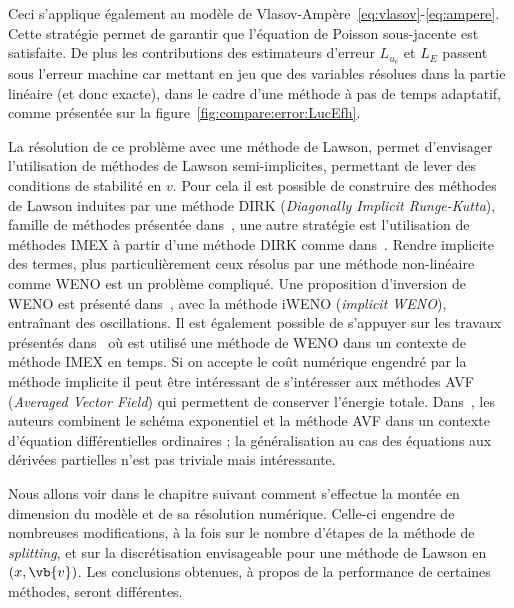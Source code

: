 Ceci s'applique également au modèle de Vlasov-Ampère~\eqref{eq:vlasov}-\eqref{eq:ampere}. Cette stratégie permet de garantir que l'équation de Poisson sous-jacente est satisfaite. De plus les contributions des estimateurs d'erreur $L_{u_c}$ et $L_E$ passent sous l'erreur machine car mettant en jeu que des variables résolues dans la partie linéaire (et donc exacte), dans le cadre d'une méthode à pas de temps adaptatif, comme présentée sur la figure~\ref{fig:compare:error:LucEfh}.

La résolution de ce problème avec une méthode de Lawson, permet d'envisager l'utilisation de méthodes de Lawson semi-implicites, permettant de lever des conditions de stabilité en $v$. Pour cela il est possible de construire des méthodes de Lawson induites par une méthode DIRK (\emph{Diagonally Implicit Runge-Kutta}), famille de méthodes présentée dans~\cite{Alexander:1976}, une autre stratégie est l'utilisation de méthodes IMEX à partir d'une méthode DIRK comme dans~\cite{Cho:2021}. Rendre implicite des termes, plus particulièrement ceux résolus par une méthode non-linéaire comme WENO est un problème compliqué. Une proposition d'inversion de WENO est présenté dans~\cite{Gottlieb:2006}, avec la méthode iWENO (\emph{implicit WENO}), entraînant des oscillations. Il est également possible de s'appuyer sur les travaux présentés dans~\cite{Boscarino:2019} où est utilisé une méthode de WENO dans un contexte de méthode IMEX en temps. Si on accepte le coût numérique engendré par la méthode implicite il peut être intéressant de s'intéresser aux méthodes AVF (\emph{Averaged Vector Field}) qui permettent de conserver l'énergie totale. Dans~\cite{Mei:2021}, les auteurs combinent le schéma exponentiel et la méthode AVF dans un contexte d'équation différentielles ordinaires ; la généralisation au cas des équations aux dérivées partielles n'est pas triviale mais intéressante.

Nous allons voir dans le chapitre suivant comment s'effectue la montée en dimension du modèle et de sa résolution numérique. Celle-ci engendre de nombreuses modifications, à la fois sur le nombre d'étapes de la méthode de \emph{splitting}, et sur la discrétisation envisageable pour une méthode de Lawson en $(x,\vb{v})$. Les conclusions obtenues, à propos de la performance de certaines méthodes, seront différentes.
